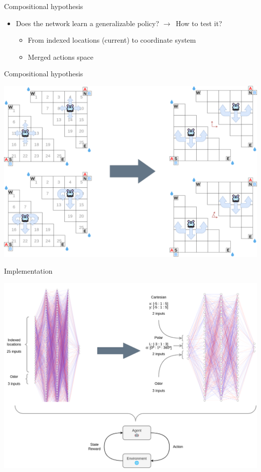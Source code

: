 \documentclass[bigger]{beamer}
\begin{document}
\begin{frame}[<+->][label={sec:org5f26c38}]{Compositional hypothesis}
\begin{itemize}
\item Does the network learn a generalizable policy? \(\to\)~How to test it?
\begin{itemize}
\item From indexed locations (current) to coordinate system
\item Merged actions space
\end{itemize}
\end{itemize}
\end{frame}
\begin{frame}[label={sec:org046f332}]{Compositional hypothesis}
\begin{center}
\includegraphics[width=.9\linewidth]{img/env_new-triangle-task.drawio.png}
\end{center}
\end{frame}
\begin{frame}[label={sec:orga3d528c}]{Implementation}
\begin{center}
\includegraphics[width=.9\linewidth]{img/nn.drawio.png}
\end{center}
\end{frame}
\end{document}
